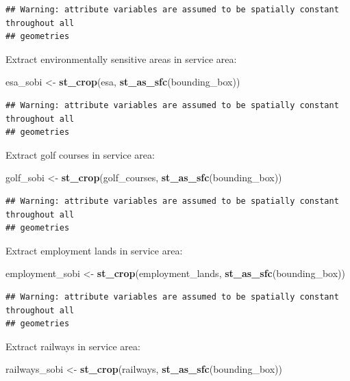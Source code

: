 \documentclass[
]{article}
\newenvironment{Shaded}{\begin{snugshade}}{\end{snugshade}}
\newcommand{\KeywordTok}[1]{\textcolor[rgb]{0.13,0.29,0.53}{\textbf{#1}}}
\newcommand{\NormalTok}[1]{#1}
\newcommand{\StringTok}[1]{\textcolor[rgb]{0.31,0.60,0.02}{#1}}
\begin{document}
\begin{verbatim}
## Warning: attribute variables are assumed to be spatially constant throughout all
## geometries
\end{verbatim}

Extract environmentally sensitive areas in service area:

\begin{Shaded}
\begin{Highlighting}[]
\NormalTok{esa_sobi <-}\StringTok{ }\KeywordTok{st_crop}\NormalTok{(esa, }\KeywordTok{st_as_sfc}\NormalTok{(bounding_box))}
\end{Highlighting}
\end{Shaded}

\begin{verbatim}
## Warning: attribute variables are assumed to be spatially constant throughout all
## geometries
\end{verbatim}

Extract golf courses in service area:

\begin{Shaded}
\begin{Highlighting}[]
\NormalTok{golf_sobi <-}\StringTok{ }\KeywordTok{st_crop}\NormalTok{(golf_courses, }\KeywordTok{st_as_sfc}\NormalTok{(bounding_box))}
\end{Highlighting}
\end{Shaded}

\begin{verbatim}
## Warning: attribute variables are assumed to be spatially constant throughout all
## geometries
\end{verbatim}

Extract employment lands in service area:

\begin{Shaded}
\begin{Highlighting}[]
\NormalTok{employment_sobi <-}\StringTok{ }\KeywordTok{st_crop}\NormalTok{(employment_lands, }\KeywordTok{st_as_sfc}\NormalTok{(bounding_box))}
\end{Highlighting}
\end{Shaded}

\begin{verbatim}
## Warning: attribute variables are assumed to be spatially constant throughout all
## geometries
\end{verbatim}

Extract railways in service area:

\begin{Shaded}
\begin{Highlighting}[]
\NormalTok{railways_sobi <-}\StringTok{ }\KeywordTok{st_crop}\NormalTok{(railways, }\KeywordTok{st_as_sfc}\NormalTok{(bounding_box))}
\end{Highlighting}
\end{Shaded}
\end{document}
